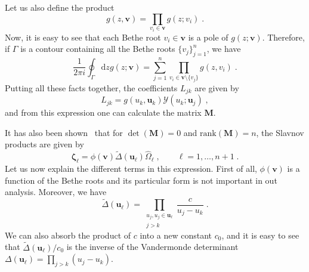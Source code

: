 \documentclass[a4paper,12pt]{amsart}
\begin{document}
Let us also define the product 
\begin{equation}
  g(z, \bm{v}) = \prod_{v_i\in \bm{v}} g(z; v_i)\; . 
\end{equation}
Now, it is easy to see that each Bethe root \( v_i \in \bm{v}\) is a
pole of \(g(z;\bm{v})\). Therefore, if \(\Gamma\) is a contour
containing all the Bethe roots \(\{v_j\}_{j=1}^n\), we have
\begin{equation}
  \frac{1}{2 \pi i}\oint_{\Gamma} \mathrm{d}z g(z; \bm{v}) = \sum_{j=1}^n
  \prod_{v_i \in \bm{v}\setminus \{v_j\}} g(z, v_i)\; .
\end{equation}
Putting all these facts together, the coefficients \(L_{jk}\) are given by
\begin{equation}
  L_{jk} = g(u_k, \bm{u}_k) \mathcal{Y}(u_k; \bm{u}_j)\; ,
\end{equation}
and from this expression one can calculate the matrix \(\bm{M}\).

It has also been shown~\cite{Belliard:2019bfz} that for \(\det(\bm{M})
= 0\) and \(\mathrm{rank}(\bm{M}) = n\), the Slavnov products are
given by
\begin{equation}
 \bm{\zeta}_\ell = \phi(\bm{v}) \tilde{\Delta}(\bm{u}_\ell)\hat{\Omega}_\ell\; , \qquad \ell = 1, \dots, n+1\; .
\end{equation}
Let us now explain the different terms in this expression.  First of
all, \(\phi(\bm{v})\) is a function of the Bethe roots and its
particular form is not important in out analysis. Moreover, we have
\begin{equation}
  \tilde{\Delta}(\bm{u}_\ell) = \prod_{\substack{u_j, u_j \in \bm{u}_\ell \\ j>k}} \frac{c}{u_j - u_k}\; .
\end{equation}
We can also absorb the product of \(c\) into a new constant
\(c_0\), and it is easy to see that \(\tilde{\Delta}(\bm{u}_\ell)/c_0\) is the
inverse of the Vandermonde determinant \(\Delta(\bm{u}_\ell) =
\prod_{j>k}(u_j - u_k)\).
\end{document}
